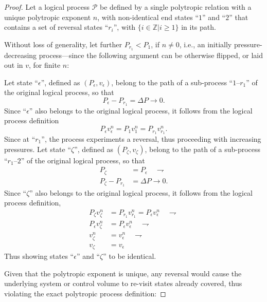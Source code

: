 \documentclass[fleqn,11pt]{SelfArx}
\begin{document}
    \begin{proof}
        Let a logical process $\mathcal{P}$ be defined by a single polytropic  relation  with  a
        unique polytropic exponent $n$, with non-identical end states ``$1$'' and  ``$2$''  that
        contains a set of reversal states ``$r_i$'', with $\{ i \in \mathbb{Z} | i  \geqslant  1
        \}$ in its path.

        Without loss of generality, let further $P_{r_1}  <  P_1$,  if  $n  \neq  0$,  i.e.,  an
        initially pressure-decreasing process---since the following argument  can  be  otherwise
        flipped, or laid out in $v$, for finite $n$:

        Let state ``$\epsilon$'', defined as $(P_{\epsilon}, v_{\epsilon})$, belong to the  path
        of a sub-process ``$1$--$r_1$'' of the original logical process, so that
        \begin{equation}
            P_{\epsilon} - P_{r_1} = \Delta P \to 0.
            \label{eq:proof.Delta.P.epsi}
        \end{equation}
        Since ``$\epsilon$'' also belongs to the original logical process, it follows from the
        logical process definition
        \begin{equation}
            P_{\epsilon}v_{\epsilon}^n = P_1v_1^n = P_{r_1}v_{r_1}^n.
            \label{eq:proof.Process.epsi}
        \end{equation}
        Since at ``$r_1$'', the process experiments a reversal, thus proceeding with  increasing
        pressures. Let state ``$\zeta$'', defined as $(P_{\zeta},  v_{\zeta})$,  belong  to  the
        path of a sub-process ``$r_1$--$2$'' of the original logical process, so that
        \begin{align}
            P_{\zeta} & = P_{\epsilon} \quad\rightharpoondown 
            \label{eq:proof.P.zeta} \\
            P_{\zeta} - P_{r_1} & = \Delta P \to 0.
            \label{eq:proof.Delta.P.zeta}
        \end{align}
        Since ``$\zeta$'' also belongs to the original logical process, it follows from the
        logical process definition,
        \begin{align}
            P_{\zeta}v_{\zeta}^n & = P_{r_1}v_{r_1}^n = P_{\epsilon}v_{\epsilon}^n\quad\rightharpoondown
            \label{eq:proof.Process.zeta} \\
            P_{\epsilon}v_{\zeta}^n & = P_{\epsilon}v_{\epsilon}^n \quad\rightharpoondown \\
            v_{\zeta}^n & = v_{\epsilon}^n \quad\rightharpoondown \\
            v_{\zeta} & = v_{\epsilon}
            \label{eq:proof.vzeta=vepsi}
        \end{align}
        Thus showing states ``$\epsilon$'' and ``$\zeta$'' to be identical.

        Given that the polytropic exponent is unique, any reversal would  cause  the  underlying
        system or control volume to re-visit states already covered, thus  violating  the  exact
        polytropic process definition:
    \end{proof}
\end{document}
